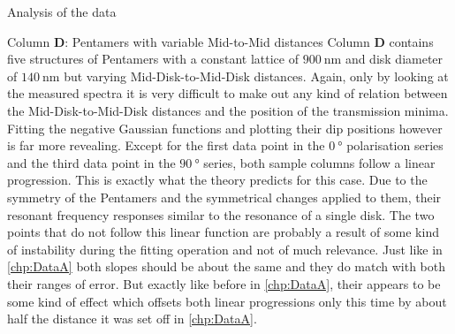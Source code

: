 \documentclass[pdftex, a4paper,11pt, twoside, UKenglish]{report}
\begin{document}
\begin{chapter}{Analysis of the data}
    \newpage
    \begin{section}{Column \textbf{D}: Pentamers with variable Mid-to-Mid
        distances}
      \label{chp:DataD}
      Column \textbf{D} contains five structures of Pentamers with a constant
      lattice of $\SI{900}{\nano\meter}$ and disk diameter of
      $\SI{140}{\nano\meter}$ but varying Mid-Disk-to-Mid-Disk distances.
      Again, only by looking at the measured spectra it is very difficult to
      make out any kind of relation between the Mid-Disk-to-Mid-Disk distances
      and the position of the transmission minima. Fitting the negative Gaussian
      functions and plotting their dip positions however is far more revealing.
      Except for the first data point in the $\SI{0}{\degree}$ polarisation
      series and the third data point in the $\SI{90}{\degree}$ series, both
      sample columns follow a linear progression. This is exactly what the
      theory predicts for this case. Due to the symmetry of the Pentamers and
      the symmetrical changes applied to them, their resonant frequency
      responses similar to the resonance of a single disk. \newline
      The two points that do not follow this linear function are probably a
      result of some kind of instability during the fitting operation and not
      of much relevance.\newline
      Just like in \cref{chp:DataA} both slopes should be about the same and
      they do match with both their ranges of error. But exactly like before in
      \cref{chp:DataA}, their appears to be some kind of effect which offsets
      both linear progressions only this time by about half the distance it
      was set off in \cref{chp:DataA}.
      
      

\end{section}
\end{chapter}
\end{document}
